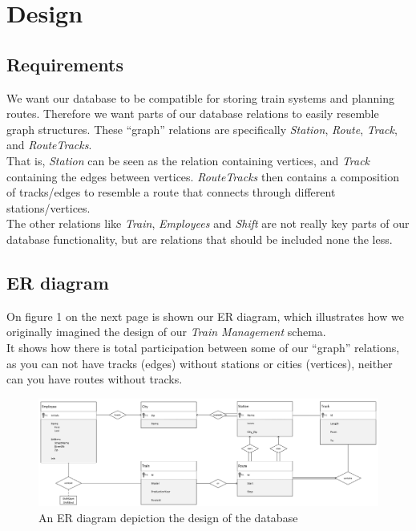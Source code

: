 \section{Design}



\subsection{Requirements} %
We want our database to be compatible for storing train systems and planning 
routes. Therefore we want parts of our database relations to easily resemble 
graph structures. These ``graph'' relations are specifically \emph{Station}, 
\emph{Route}, \emph{Track}, and \emph{RouteTracks}.\\
That is, \emph{Station} can be seen as the relation containing vertices, and \emph{Track} containing the edges between vertices. \emph{RouteTracks} then contains a composition of tracks/edges to resemble a route that connects through different stations/vertices.\\[12pt]
The other relations like \emph{Train}, \emph{Employees} and \emph{Shift} are not really key parts of our database functionality, but are relations that should be included none the less.

\subsection{ER diagram}
On figure 1 on the next page is shown our ER diagram, which illustrates how we 
originally imagined the design of our \emph{Train Management} schema.\\
It shows how there is total participation between some of our ``graph'' 
relations, as you can not have tracks (edges) without stations or cities 
(vertices), neither can you have routes without tracks.


\newpage
\begin{figure}[ht!]
    \centering
    \includegraphics[angle=90,origin=c,width=.4\textwidth]{img/Handwritten_ER}
    \caption{An ER diagram depiction the design of the database}
    \label{fig:ER}
\end{figure}

